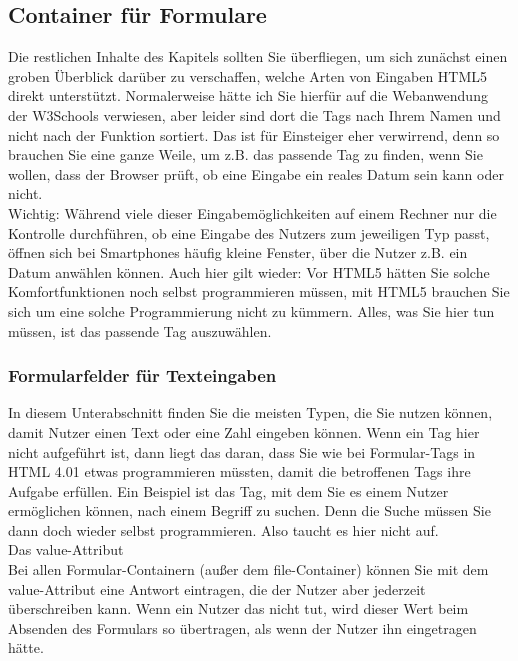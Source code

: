 \subsection{Container für Formulare}

Die restlichen Inhalte des Kapitels sollten Sie überfliegen, um sich zunächst einen groben Überblick darüber zu verschaffen, welche Arten von Eingaben HTML5 direkt unterstützt. Normalerweise hätte ich Sie hierfür auf die Webanwendung der W3Schools verwiesen, aber leider sind dort die Tags nach Ihrem Namen und nicht nach der Funktion sortiert. Das ist für Einsteiger eher verwirrend, denn so brauchen Sie eine ganze Weile, um z.B. das passende Tag zu finden, wenn Sie wollen, dass der Browser prüft, ob eine Eingabe ein reales Datum sein kann oder nicht.\\

Wichtig: Während viele dieser Eingabemöglichkeiten auf einem Rechner nur die Kontrolle durchführen, ob eine Eingabe des Nutzers zum jeweiligen Typ passt, öffnen sich bei Smartphones häufig kleine Fenster, über die Nutzer z.B. ein Datum anwählen können. Auch hier gilt wieder: Vor HTML5 hätten Sie solche Komfortfunktionen noch selbst programmieren müssen, mit HTML5 brauchen Sie sich um eine solche Programmierung nicht zu kümmern. Alles, was Sie hier tun müssen, ist das passende Tag auszuwählen.

\subsubsection{Formularfelder für Texteingaben}

In diesem Unterabschnitt finden Sie die meisten Typen, die Sie nutzen können, damit Nutzer einen Text oder eine Zahl eingeben können. Wenn ein Tag hier nicht aufgeführt ist, dann liegt das daran, dass Sie wie bei Formular-Tags in HTML 4.01 etwas programmieren müssten, damit die betroffenen Tags ihre Aufgabe erfüllen. Ein Beispiel ist das Tag, mit dem Sie es einem Nutzer ermöglichen können, nach einem Begriff zu suchen. Denn die Suche müssen Sie dann doch wieder selbst programmieren. Also taucht es hier nicht auf.\\

Das value-Attribut\\

Bei allen Formular-Containern (außer dem file-Container) können Sie mit dem value-Attribut eine Antwort eintragen, die der Nutzer aber jederzeit überschreiben kann. Wenn ein Nutzer das nicht tut, wird dieser Wert beim Absenden des Formulars so übertragen, als wenn der Nutzer ihn eingetragen hätte.\\

